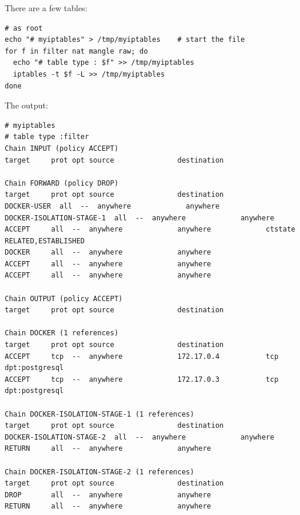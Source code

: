\documentclass[letter,11pt,oneside]{article}
\begin{document}
There are a few tables:


\begin{lstlisting}
# as root
echo "# myiptables" > /tmp/myiptables    # start the file
for f in filter nat mangle raw; do
  echo "# table type : $f" >> /tmp/myiptables
  iptables -t $f -L >> /tmp/myiptables
done
\end{lstlisting}

\clearpage
The output:

\begin{tcolorbox}[breakable]
  \begingroup \fontsize{6pt}{6pt}
\selectfont
\begin{verbatim} 
# myiptables
# table type :filter
Chain INPUT (policy ACCEPT)
target     prot opt source               destination         

Chain FORWARD (policy DROP)
target     prot opt source               destination         
DOCKER-USER  all  --  anywhere             anywhere            
DOCKER-ISOLATION-STAGE-1  all  --  anywhere             anywhere            
ACCEPT     all  --  anywhere             anywhere             ctstate RELATED,ESTABLISHED
DOCKER     all  --  anywhere             anywhere            
ACCEPT     all  --  anywhere             anywhere            
ACCEPT     all  --  anywhere             anywhere            

Chain OUTPUT (policy ACCEPT)
target     prot opt source               destination         

Chain DOCKER (1 references)
target     prot opt source               destination         
ACCEPT     tcp  --  anywhere             172.17.0.4           tcp dpt:postgresql
ACCEPT     tcp  --  anywhere             172.17.0.3           tcp dpt:postgresql

Chain DOCKER-ISOLATION-STAGE-1 (1 references)
target     prot opt source               destination         
DOCKER-ISOLATION-STAGE-2  all  --  anywhere             anywhere            
RETURN     all  --  anywhere             anywhere            

Chain DOCKER-ISOLATION-STAGE-2 (1 references)
target     prot opt source               destination         
DROP       all  --  anywhere             anywhere            
RETURN     all  --  anywhere             anywhere            


\end{verbatim}
\end{tcolorbox}
\end{document}
